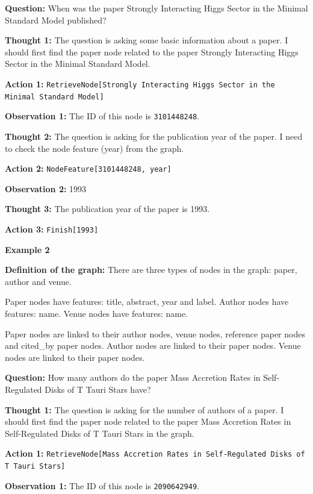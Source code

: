 \textbf{Question:}
When was the paper Strongly Interacting Higgs Sector in the Minimal Standard Model published? \par

\textbf{Thought 1:} The question is asking some basic information about a paper. I should first find the paper node related to the paper Strongly Interacting Higgs Sector in the Minimal Standard Model. \par
\textbf{Action 1:} \texttt{RetrieveNode[Strongly Interacting Higgs Sector in the Minimal Standard Model]} \par
\textbf{Observation 1:} The ID of this node is \texttt{3101448248}. \par

\textbf{Thought 2:} The question is asking for the publication year of the paper. I need to check the node feature (year) from the graph. \par
\textbf{Action 2:} \texttt{NodeFeature[3101448248, year]} \par
\textbf{Observation 2:} 1993 \par

\textbf{Thought 3:} The publication year of the paper is 1993. \par
\textbf{Action 3:} \texttt{Finish[1993]} \par

\bigskip %

\textbf{Example 2} \par
\medskip

\textbf{Definition of the graph:}
There are three types of nodes in the graph: paper, author and venue. \par
Paper nodes have features: title, abstract, year and label. Author nodes have features: name. Venue nodes have features: name. \par
Paper nodes are linked to their author nodes, venue nodes, reference paper nodes and cited\_by paper nodes. Author nodes are linked to their paper nodes. Venue nodes are linked to their paper nodes. \par

\textbf{Question:}
How many authors do the paper Mass Accretion Rates in Self-Regulated Disks of T Tauri Stars have? \par

\textbf{Thought 1:} The question is asking for the number of authors of a paper. I should first find the paper node related to the paper Mass Accretion Rates in Self-Regulated Disks of T Tauri Stars in the graph. \par
\textbf{Action 1:} \texttt{RetrieveNode[Mass Accretion Rates in Self-Regulated Disks of T Tauri Stars]} \par
\textbf{Observation 1:} The ID of this node is \texttt{2090642949}. \par

